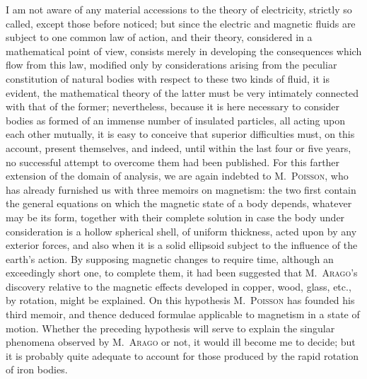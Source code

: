 \documentclass[11pt,notitlepage]{amsart}
\let\Person\textsc
\begin{document}
I am not aware of any material accessions to the theory of electricity,
strictly so called, except those before noticed; but since the electric and
magnetic fluids are subject to one common law of action, and their theory,
considered in a mathematical point of view, consists merely in developing the
consequences which flow from this law, modified only by considerations arising
from the peculiar constitution of natural bodies with respect to these two kinds
of fluid, it is evident, the mathematical theory of the latter must be
very intimately connected with that of the former;
nevertheless, because it is here
necessary to consider bodies as formed of an immense number of insulated
particles, all acting upon each other mutually, it is easy to conceive that
superior difficulties must, on this account,
present themselves, and indeed, until
within the last four or five years, no successful attempt to overcome them had
been published. For this farther extension of the domain of analysis, we are
again indebted to M.~\Person{Poisson},
who has already furnished us with three memoirs on magnetism:
the two first contain the general equations on which the
magnetic state of a body depends, whatever may be its form, together with
their complete solution in case the body under consideration is a hollow 
spherical shell, of uniform thickness,
acted upon by any exterior forces, and also
when it is a solid ellipsoid subject to the influence of the earth's action. By
supposing magnetic changes to require time, although an exceedingly short one,
to complete them, it had been suggested that M.~\Person{Arago}'s
discovery relative
to the magnetic effects developed in copper, wood, glass, etc., by rotation,
might be explained. On this hypothesis M.~\Person{Poisson}
has founded his third memoir,
and thence deduced formulae applicable to magnetism in a state of motion.
Whether the preceding hypothesis will serve to explain the singular phenomena
observed by M.~\Person{Arago} or not,
it would ill become me to decide; but it is
probably quite adequate to account for those produced by the rapid rotation of
iron bodies.
\end{document}
